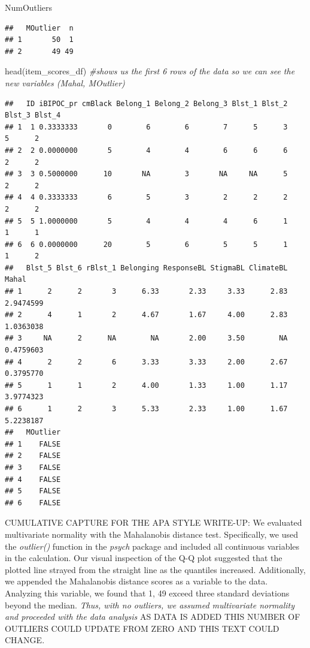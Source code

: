\documentclass[
]{book}
\newenvironment{Shaded}{\begin{snugshade}}{\end{snugshade}}
\newcommand{\CommentTok}[1]{\textcolor[rgb]{0.56,0.35,0.01}{\textit{#1}}}
\newcommand{\FunctionTok}[1]{\textcolor[rgb]{0.00,0.00,0.00}{#1}}
\newcommand{\NormalTok}[1]{#1}
\begin{document}
\begin{Shaded}
\begin{Highlighting}[]
\NormalTok{NumOutliers}
\end{Highlighting}
\end{Shaded}

\begin{verbatim}
##   MOutlier  n
## 1       50  1
## 2       49 49
\end{verbatim}

\begin{Shaded}
\begin{Highlighting}[]
\FunctionTok{head}\NormalTok{(item\_scores\_df) }\CommentTok{\#shows us the first 6 rows of the data so we can see the new variables (Mahal, MOutlier)}
\end{Highlighting}
\end{Shaded}

\begin{verbatim}
##   ID iBIPOC_pr cmBlack Belong_1 Belong_2 Belong_3 Blst_1 Blst_2 Blst_3 Blst_4
## 1  1 0.3333333       0        6        6        7      5      3      5      2
## 2  2 0.0000000       5        4        4        6      6      6      2      2
## 3  3 0.5000000      10       NA        3       NA     NA      5      2      2
## 4  4 0.3333333       6        5        3        2      2      2      2      2
## 5  5 1.0000000       5        4        4        4      6      1      1      1
## 6  6 0.0000000      20        5        6        5      5      1      1      2
##   Blst_5 Blst_6 rBlst_1 Belonging ResponseBL StigmaBL ClimateBL     Mahal
## 1      2      2       3      6.33       2.33     3.33      2.83 2.9474599
## 2      4      1       2      4.67       1.67     4.00      2.83 1.0363038
## 3     NA      2      NA        NA       2.00     3.50        NA 0.4759603
## 4      2      2       6      3.33       3.33     2.00      2.67 0.3795770
## 5      1      1       2      4.00       1.33     1.00      1.17 3.9774323
## 6      1      2       3      5.33       2.33     1.00      1.67 5.2238187
##   MOutlier
## 1    FALSE
## 2    FALSE
## 3    FALSE
## 4    FALSE
## 5    FALSE
## 6    FALSE
\end{verbatim}

CUMULATIVE CAPTURE FOR THE APA STYLE WRITE-UP: We evaluated multivariate normality with the Mahalanobis distance test. Specifically, we used the \emph{outlier()} function in the \emph{psych} package and included all continuous variables in the calculation. Our visual inspection of the Q-Q plot suggested that the plotted line strayed from the straight line as the quantiles increased. Additionally, we appended the Mahalanobis distance scores as a variable to the data. Analyzing this variable, we found that 1, 49 exceed three standard deviations beyond the median. \emph{Thus, with no outliers, we assumed multivariate normality and proceeded with the data analysis} AS DATA IS ADDED THIS NUMBER OF OUTLIERS COULD UPDATE FROM ZERO AND THIS TEXT COULD CHANGE.
\end{document}
